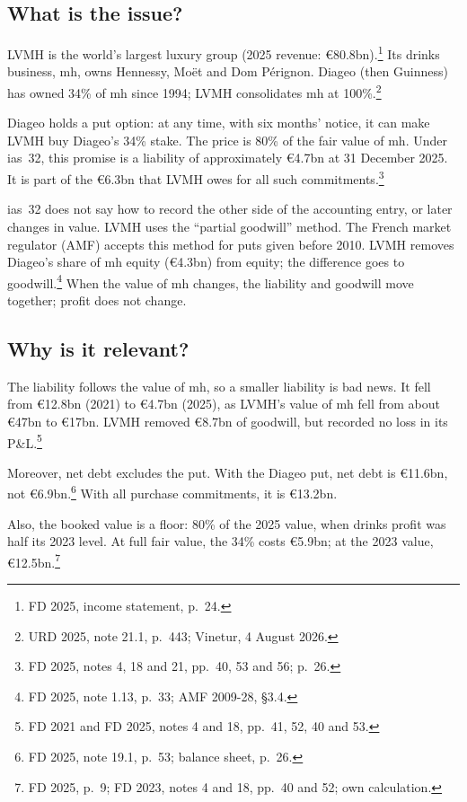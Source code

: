 \subsection*{What is the issue?}
LVMH is the world's largest luxury group (2025 revenue: \euro80.8bn).\footnote{FD 2025, income statement, p.~24.}
Its drinks business, \ac{mh}, owns Hennessy, Mo\"et and Dom P\'erignon.
Diageo (then Guinness) has owned 34\% of \acs{mh} since 1994; LVMH consolidates \acs{mh} at 100\%.\footnote{URD 2025, note 21.1, p.~443; Vinetur, 4 August 2026.}

Diageo holds a put option: at any time, with six months' notice, it can make LVMH buy Diageo's 34\% stake.
The price is 80\% of the fair value of \acs{mh}.
Under \ac{ias}~32, this promise is a liability of approximately \euro4.7bn at 31 December 2025. It is part of the \euro6.3bn that LVMH owes for all such commitments.\footnote{FD 2025, notes 4, 18 and 21, pp.~40, 53 and 56; p.~26.}

\acs{ias}~32 does not say how to record the other side of the accounting entry, or later changes in value.
LVMH uses the ``partial goodwill'' method. The French market regulator (AMF) accepts this method for puts given before 2010.
LVMH removes Diageo's share of \acs{mh} equity (\euro4.3bn) from equity; the difference goes to goodwill.\footnote{FD 2025, note 1.13, p.~33; AMF 2009-28, \S3.4.}
When the value of \acs{mh} changes, the liability and goodwill move together; profit does not change.

\subsection*{Why is it relevant?}
The liability follows the value of \acs{mh}, so a smaller liability is bad news.
It fell from \euro12.8bn (2021) to \euro4.7bn (2025), as LVMH's value of \acs{mh} fell from about \euro47bn to \euro17bn.
LVMH removed \euro8.7bn of goodwill, but recorded no loss in its P\&L.\footnote{FD 2021 and FD 2025, notes 4 and 18, pp.~41, 52, 40 and 53.}

Moreover, net debt excludes the put. With the Diageo put, net debt is \euro11.6bn, not \euro6.9bn.\footnote{FD 2025, note 19.1, p.~53; balance sheet, p.~26.}
\newpage %
With all purchase commitments, it is \euro13.2bn.

Also, the booked value is a floor: 80\% of the 2025 value, when drinks profit was half its 2023 level.
At full fair value, the 34\% costs \euro5.9bn; at the 2023 value, \euro12.5bn.\footnote{FD 2025, p.~9; FD 2023, notes 4 and 18, pp.~40 and 52; own calculation.}

